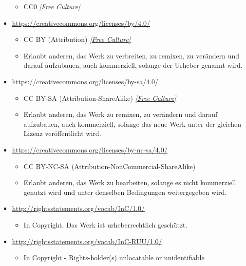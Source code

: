 \documentclass[
  letterpaper,
  DIV=11,
  numbers=noendperiod,
  landscape,
  a4paper,
  geometry:margin=1in]{scrartcl}
\providecommand{\tightlist}{%
  \setlength{\itemsep}{0pt}\setlength{\parskip}{0pt}}\usepackage{longtable,booktabs,array}
\begin{document}
\begin{longtable}[]
\begin{minipage}[t]{\linewidth}
\begin{itemize}
  \begin{itemize}
  \tightlist
  \item
    CC0
    \href{https://creativecommons.org/public-domain/freeworks/}{\emph{{[}Free
    Culture{]}}}
  \end{itemize}
\item
  \url{https://creativecommons.org/licenses/by/4.0/}

  \begin{itemize}
  \tightlist
  \item
    CC BY (Attribution)
    \href{https://creativecommons.org/public-domain/freeworks/}{\emph{{[}Free
    Culture{]}}}
  \item
    Erlaubt anderen, das Werk zu verbreiten, zu remixen, zu verändern
    und darauf aufzubauen, auch kommerziell, solange der Urheber genannt
    wird.
  \end{itemize}
\item
  \url{https://creativecommons.org/licenses/by-sa/4.0/}

  \begin{itemize}
  \tightlist
  \item
    CC BY-SA (Attribution-ShareAlike)
    \href{https://creativecommons.org/public-domain/freeworks/}{\emph{{[}Free
    Culture{]}}}
  \item
    Erlaubt anderen, das Werk zu remixen, zu verändern und darauf
    aufzubauen, auch kommerziell, solange das neue Werk unter der
    gleichen Lizenz veröffentlicht wird.
  \end{itemize}
\item
  \url{https://creativecommons.org/licenses/by-nc-sa/4.0/}

  \begin{itemize}
  \tightlist
  \item
    CC BY-NC-SA (Attribution-NonCommercial-ShareAlike)
  \item
    Erlaubt anderen, das Werk zu bearbeiten, solange es nicht
    kommerziell genutzt wird und unter denselben Bedingungen
    weitergegeben wird.
  \end{itemize}
\item
  \url{http://rightsstatements.org/vocab/InC/1.0/}

  \begin{itemize}
  \tightlist
  \item
    In Copyright. Das Werk ist urheberrechtlich geschützt.
  \end{itemize}
\item
  \url{http://rightsstatements.org/vocab/InC-RUU/1.0/}

  \begin{itemize}
  \tightlist
  \item
    In Copyright - Rights-holder(s) unlocatable or unidentifiable
  \end{itemize}
\end{itemize}
\end{minipage} \\
\end{longtable}
\end{document}
